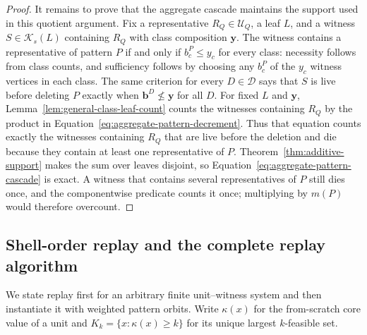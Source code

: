 \begin{proof}
It remains to prove that the aggregate cascade maintains the support used in this quotient argument.
%
Fix a representative $R_Q\in\mathcal U_Q$, a leaf $L$, and a witness $S\in\mathcal K_s(L)$ containing $R_Q$ with class composition $\mathbf y$.
%
The witness contains a representative of pattern $P$ if and only if $b_c^P\leq y_c$ for every class: necessity follows from class counts, and sufficiency follows by choosing any $b_c^P$ of the $y_c$ witness vertices in each class.
%
The same criterion for every $D\in\mathcal D$ says that $S$ is live before deleting $P$ exactly when $\mathbf b^D\nleq\mathbf y$ for all $D$.
%
For fixed $L$ and $\mathbf y$, Lemma~\ref{lem:general-class-leaf-count} counts the witnesses containing $R_Q$ by the product in Equation~\eqref{eq:aggregate-pattern-decrement}.
%
Thus that equation counts exactly the witnesses containing $R_Q$ that are live before the deletion and die because they contain at least one representative of $P$.
%
Theorem~\ref{thm:additive-support} makes the sum over leaves disjoint, so Equation~\eqref{eq:aggregate-pattern-cascade} is exact.
%
A witness that contains several representatives of $P$ still dies once, and the componentwise predicate counts it once; multiplying by $m(P)$ would therefore overcount.
\end{proof}

\subsection{Shell-order replay and the complete replay algorithm}
\label{subsec:shell-order-replay}

We state replay first for an arbitrary finite unit--witness system and then instantiate it with weighted pattern orbits.
%
Write $\kappa(x)$ for the from-scratch core value of a unit and $K_k=\{x:\kappa(x)\geq k\}$ for its unique largest $k$-feasible set.

